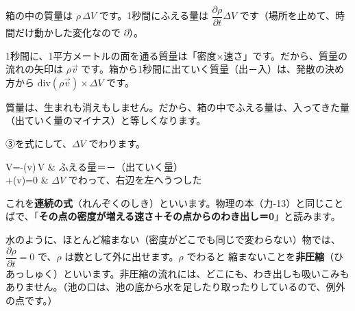 \begin{enumerate}[label={\bkcircled[\bkTT]{\arabic*}}, leftmargin=2.4\zw, itemsep=2pt, topsep=2pt]
\item 箱の中の質量は $\rho\,\Delta V$ です。1秒間にふえる量は $\dfrac{\partial\rho}{\partial t}\Delta V$ です（場所を止めて、時間だけ動かした変化なので $\partial$）。
\item 1秒間に、1平方メートルの面を通る質量は「密度×速さ」です。だから、質量の流れの矢印は $\rho\vec v$ です。箱から1秒間に出ていく質量（\mbox{出－入}）は、発散の決め方から $\mathrm{div}(\rho\vec v)\times\Delta V$ です。
\item 質量は、生まれも消えもしません。だから、箱の中でふえる量は、入ってきた量（出ていく量のマイナス）と等しくなります。
\end{enumerate}
③を式にして、$\Delta V$ でわります。
\begin{bkhenkei}[0.5]
\Delta V=-(\rho\vec v)\,\Delta V & ふえる量＝－（出ていく量） \\
+(\rho\vec v)=0 & $\Delta V$ でわって、右辺を左へうつした \\
\end{bkhenkei}
これを\textbf{連続の式}（れんぞくのしき）といいます。物理の本（力-13）と同じことばで、「\textbf{その点の密度が増える速さ＋その点からのわき出し＝0}」と読みます。

水のように、ほとんど縮まない（密度がどこでも同じで変わらない）物では、$\dfrac{\partial\rho}{\partial t}=0$ で、$\rho$ は数として外に出せます。$\rho$ でわると
縮まないことを\textbf{非圧縮}（ひあっしゅく）といいます。非圧縮の流れには、どこにも、わき出しも吸いこみもありません。（池の口は、池の底から水を足したり取ったりしているので、例外の点です。）


